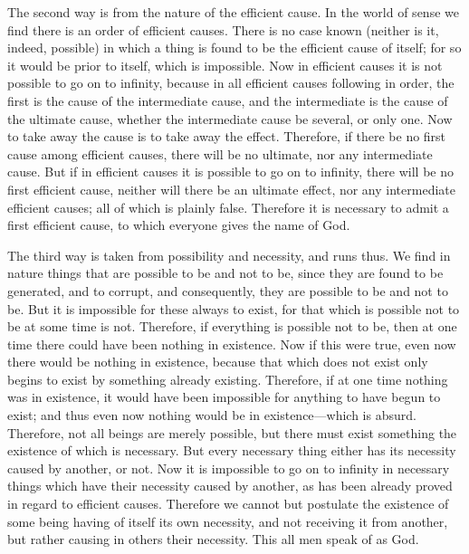The second way is from the nature of the efficient cause. In the world
of sense we find there is an order of efficient causes. There is no
case known (neither is it, indeed, possible) in which a thing is found
to be the efficient cause of itself; for so it would be prior to
itself, which is impossible. Now in efficient causes it is not
possible to go on to infinity, because in all efficient causes
following in order, the first is the cause of the intermediate cause,
and the intermediate is the cause of the ultimate cause, whether the
intermediate cause be several, or only one. Now to take away the cause
is to take away the effect. Therefore, if there be no first cause
among efficient causes, there will be no ultimate, nor any
intermediate cause. But if in efficient causes it is possible to go on
to infinity, there will be no first efficient cause, neither will
there be an ultimate effect, nor any intermediate efficient causes;
all of which is plainly false. Therefore it is necessary to admit a
first efficient cause, to which everyone gives the name of God.

The third way is taken from possibility and necessity, and runs thus.
We find in nature things that are possible to be and not to be, since
they are found to be generated, and  to corrupt, and
consequently, they are possible to be and not to be. But it is
impossible for these always to exist, for that which is possible not
to be at some time is not. Therefore, if everything is possible not
to be, then at one time there could have been nothing in existence.
Now if this were true, even now there would be nothing in existence,
because that which does not exist only begins to exist by something
already existing. Therefore, if at one time nothing was in
existence, it would have been impossible for anything to have begun to
exist; and thus even now nothing would be in existence---which is
absurd. Therefore, not all beings are merely possible, but there must
exist something the existence of which is necessary. But every
necessary thing either has its necessity caused by another, or not.
Now it is impossible to go on to infinity in necessary things which
have their necessity caused by another, as has been already proved in
regard to efficient causes. Therefore we cannot but postulate the
existence of some being having of itself its own necessity, and not
receiving it from another, but rather causing in others their
necessity. This all men speak of as God.

